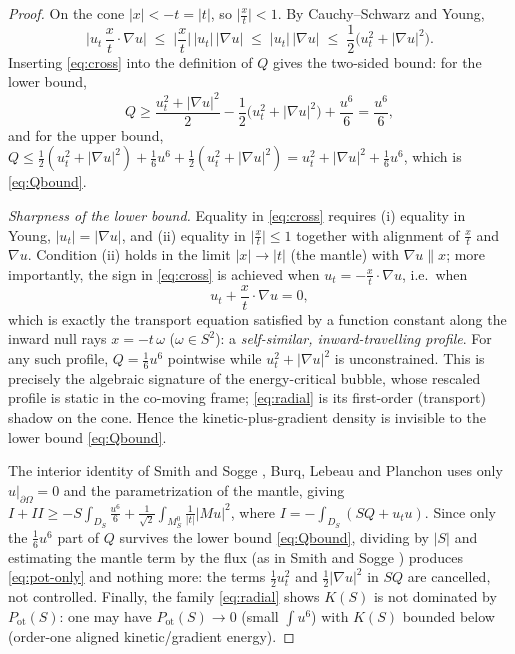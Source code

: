 \documentclass[11pt,letterpaper]{amsart}
\newcommand{\Om}{\Omega}
\begin{document}
\begin{proof}
On the cone $|x|<-t=|t|$, so $\big|\tfrac{x}{t}\big|<1$. By Cauchy--Schwarz and Young,
\begin{equation}\label{eq:cross}
\Big|u_t\,\frac{x}{t}\cdot\nabla u\Big| \;\le\; \Big|\frac{x}{t}\Big|\,|u_t|\,|\nabla u|
\;\le\; |u_t|\,|\nabla u| \;\le\; \frac12\big(u_t^2+|\nabla u|^2\big).
\end{equation}
Inserting \eqref{eq:cross} into the definition of $Q$ gives the two-sided bound: for the lower
bound,
\[
Q \ge \frac{u_t^2+|\nabla u|^2}{2}-\frac12\big(u_t^2+|\nabla u|^2\big)+\frac{u^6}{6}=\frac{u^6}{6},
\]
and for the upper bound, $Q\le\tfrac12(u_t^2+|\nabla u|^2)+\tfrac16u^6+\tfrac12(u_t^2+|\nabla
u|^2)=u_t^2+|\nabla u|^2+\tfrac16u^6$, which is \eqref{eq:Qbound}.

\emph{Sharpness of the lower bound.} Equality in \eqref{eq:cross} requires (i) equality in Young,
$|u_t|=|\nabla u|$, and (ii) equality in $\big|\tfrac{x}{t}\big|\le1$ together with alignment of
$\tfrac{x}{t}$ and $\nabla u$. Condition (ii) holds in the limit $|x|\to|t|$ (the mantle) with
$\nabla u\parallel x$; more importantly, the sign in \eqref{eq:cross} is achieved when
$u_t=-\tfrac{x}{t}\cdot\nabla u$, i.e.\ when
\begin{equation}\label{eq:radial}
u_t+\frac{x}{t}\cdot\nabla u=0,
\end{equation}
which is exactly the transport equation satisfied by a function constant along the inward null
rays $x=-t\,\omega$ ($\omega\in S^{2}$): a \emph{self-similar, inward-travelling profile}. For any
such profile, $Q=\tfrac16u^6$ pointwise while $u_t^2+|\nabla u|^2$ is unconstrained. This is
precisely the algebraic signature of the energy-critical bubble, whose rescaled profile is
static in the co-moving frame; \eqref{eq:radial} is its first-order (transport) shadow on the
cone. Hence the kinetic-plus-gradient density is invisible to the lower bound
\eqref{eq:Qbound}.

The interior identity of Smith and Sogge \cite[Step~2]{SmithSogge1995}, Burq, Lebeau and Planchon
\cite[(3.11)--(3.12)]{BurqLebeauPlanchon} uses only
$u|_{\partial\Om}=0$ and the parametrization of the mantle, giving
$I+II\ge -S\int_{D_S}\tfrac{u^6}{6}+\tfrac1{\sqrt2}\int_{M_S^0}\tfrac1{|t|}|Mu|^2$, where
$I=-\int_{D_S}(SQ+u_tu)$. Since only the $\tfrac16u^6$ part of $Q$ survives the lower bound
\eqref{eq:Qbound}, dividing by $|S|$ and estimating the mantle term by the flux (as in Smith and Sogge
\cite[(3.13)]{SmithSogge1995}) produces \eqref{eq:pot-only} and nothing more: the terms
$\tfrac12u_t^2$ and $\tfrac12|\nabla u|^2$ in $SQ$ are cancelled, not controlled. Finally, the
family \eqref{eq:radial} shows $K(S)$ is not dominated by $P_{\mathrm{ot}}(S)$: one may have
$P_{\mathrm{ot}}(S)\to0$ (small $\int u^6$) with $K(S)$ bounded below (order-one aligned
kinetic/gradient energy).
\end{proof}
\end{document}
